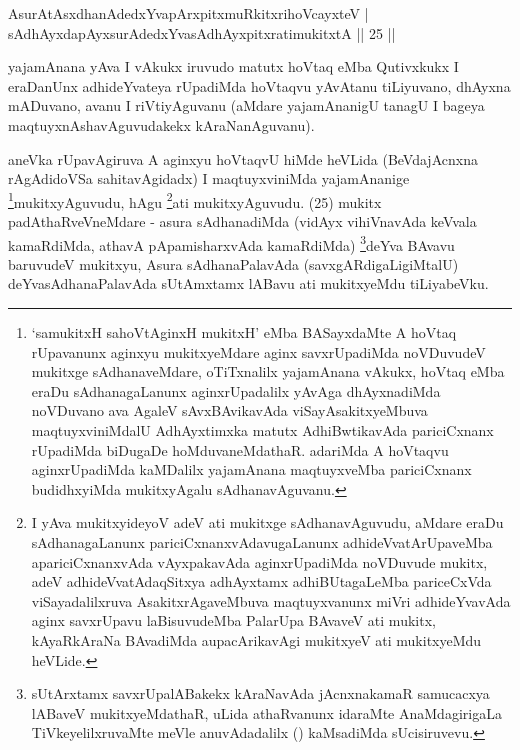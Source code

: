 \begin{shl}
AsurAtAsxdhanAdedxYvapArxpitxmuRkitxrihoVcayxteV |\\
sAdhAyxdapAyxsurAdedxYvasAdhAyxpitxratimukitxtA \hfill || 25 ||
\end{shl}

\begin{artha}
yajamAnana yAva I vAkukx iruvudo matutx hoVtaq eMba Qutivxkukx I eraDanUnx adhideYvateya rUpadiMda hoVtaqvu yAvAtanu tiLiyuvano, dhAyxna mADuvano, avanu I riVtiyAguvanu (aMdare yajamAnanigU tanagU I bageya maqtuyxnAshavAguvudakekx kAraNanAguvanu).
\end{artha}

\begin{artha}
aneVka rUpavAgiruva A aginxyu hoVtaqvU hiMde heVLida (BeVdajAcnxna rAgAdidoVSa sahitavAgidadx) I maqtuyxviniMda yajamAnanige \footnote{`samukitxH sahoVtA\s ginxH mukitxH' eMba BASayxdaMte A hoVtaq rUpavanunx aginxyu mukitxyeMdare aginx savxrUpadiMda noVDuvudeV mukitxge sAdhanaveMdare, oTiTxnalilx yajamAnana vAkukx, hoVtaq eMba eraDu sAdhanagaLanunx aginxrUpadalilx yAvAga dhAyxnadiMda noVDuvano ava AgaleV sAvxBAvikavAda viSayAsakitxyeMbuva maqtuyxviniMdalU AdhAyxtimxka matutx AdhiBwtikavAda pariciCxnanx rUpadiMda biDugaDe hoMduvaneMdathaR. adariMda A hoVtaqvu aginxrUpadiMda kaMDalilx yajamAnana maqtuyxveMba pariciCxnanx budidhxyiMda mukitxyAgalu sAdhanavAguvanu.}mukitxyAguvudu, hAgu \footnote{I yAva mukitxyideyoV adeV ati mukitxge sAdhanavAguvudu, aMdare eraDu sAdhanagaLanunx pariciCxnanxvAdavugaLanunx adhideVvatArUpaveMba apariciCxnanxvAda vAyxpakavAda aginxrUpadiMda noVDuvude mukitx, adeV adhideVvatAdaqSitxya adhAyxtamx adhiBUtagaLeMba pariceCxVda viSayadalilxruva AsakitxrAgaveMbuva maqtuyxvanunx miVri adhideYvavAda aginx savxrUpavu laBisuvudeMba PalarUpa BAvaveV ati mukitx, kAyaRkAraNa BAvadiMda aupacArikavAgi mukitxyeV ati mukitxyeMdu heVLide.}ati mukitxyAguvudu. (25) mukitx padAthaRveVneMdare - asura sAdhanadiMda (vidAyx vihiVnavAda keVvala kamaRdiMda, athavA pApamisharxvAda kamaRdiMda) \footnote{sUtArxtamx savxrUpalABakekx kAraNavAda jAcnxnakamaR samucacxya lABaveV mukitxyeMdathaR, uLida athaRvanunx idaraMte AnaMdagirigaLa TiVkeyelilxruvaMte meVle anuvAdadalilx (\quad) kaMsadiMda sUcisiruvevu.}deYva BAvavu baruvudeV mukitxyu, Asura sAdhanaPalavAda (savxgARdigaLigiMtalU) deYvasAdhanaPalavAda sUtAmxtamx lABavu ati mukitxyeMdu tiLiyabeVku.
\end{artha}


